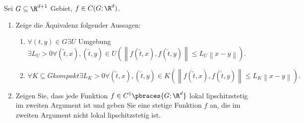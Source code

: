 \begin{exercise}
  Sei $G \subseteq \R^{d+1}$ Gebiet, $f \in C(G; \R^d)$.

  \begin{enumerate}[label = \alph*)]
    \item Zeige die Äquivalenz folgender Aussagen:
    \begin{enumerate}[label = (\arabic*)]
      \item $\forall (t, y) \in G \exists U$ Umgebung $\exists L_U > 0 \forall (\tilde{t}, x), (\tilde{t}, y) \in U
      (\left\lVert f(\tilde{t}, x), f(\tilde{t}, y) \right\rVert \leq L_U \left\lVert x-y \right\rVert).$ \label{one}

      \item $\forall K \subseteq G kompakt \exists L_K > 0 \forall (\tilde{t}, x), (\tilde{t}, y) \in K
      (\left\lVert f(\tilde{t}, x), f(\tilde{t}, y) \right\rVert \leq L_K \left\lVert x-y \right\rVert).$ \label{two}
    \end{enumerate}

    \item Zeigen Sie, dass jede Funktion $f \in C^1\pbraces{G; \R^d}$ lokal lipschitzstetig im zweiten Argument ist und geben Sie eine stetige Funktion $f$ an, die im zweiten Argument nicht lokal lipschitzstetig ist.
  \end{enumerate}

\end{exercise}

